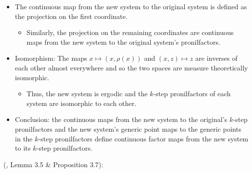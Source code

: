 \documentclass[
  british,
]{article}
\providecommand{\tightlist}{%
  \setlength{\itemsep}{0pt}\setlength{\parskip}{0pt}}
\theoremstyle{plain}
\theoremstyle{remark}
\begin{document}
\begin{itemize}
\begin{itemize}
    \begin{itemize}
    \tightlist
    \item
      A new system is created by taking the product between the original
      system and the Product/Kronecker system, defining the generic
      point as the product of the generic points in each system and the
      transformation similarly.
    \item
      The measure is defined as the push forward of the original measure
      with the measurable factor maps to each coordinate in the new
      system.
    \item
      Lemma 5.7 defines the new space to be the orbit closure of the
      generic point in the constructed product space and defining the
      projection of the first coordinate onto the original system.
    \end{itemize}
  \item
    The continuous map from the new system to the original system is
    defined as the projection on the first coordinate.

    \begin{itemize}
    \tightlist
    \item
      Similarly, the projection on the remaining coordinates are
      continuous maps from the new system to the original system's
      pronilfactors.
    \end{itemize}
  \item
    Isomorphism: The maps \(x\mapsto(x,\rho(x))\) and \((x,z)\mapsto z\)
    are inverses of each other almost everywhere and so the two spaces
    are measure theoretically isomorphic.

    \begin{itemize}
    \tightlist
    \item
      Thus, the new system is ergodic and the \(k\)-step pronilfactors
      of each system are isomorphic to each other.
    \end{itemize}
  \item
    Conclusion: the continuous maps from the new system to the
    original's \(k\)-step pronilfactors and the new system's generic
    point maps to the generic points in the \(k\)-step pronilfactors
    define continuous factor maps from the new system to its \(k\)-step
    pronilfactors.
  \end{itemize}
\end{itemize}

(, Lemma 3.5 \& Proposition 3.7):
\end{document}
